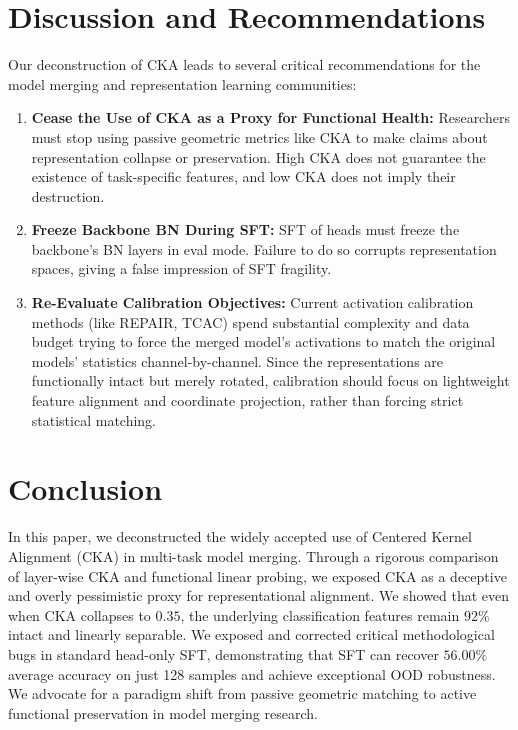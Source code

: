 \documentclass{article}
\theoremstyle{plain}
\theoremstyle{definition}
\theoremstyle{remark}
\begin{document}
\vspace{-2.5mm}
\section{Discussion and Recommendations}
\label{sec:discussion}

Our deconstruction of CKA leads to several critical recommendations for the model merging and representation learning communities:
\begin{enumerate}
  \item \textbf{Cease the Use of CKA as a Proxy for Functional Health:} Researchers must stop using passive geometric metrics like CKA to make claims about representation collapse or preservation. High CKA does not guarantee the existence of task-specific features, and low CKA does not imply their destruction.
  \item \textbf{Freeze Backbone BN During SFT:} SFT of heads must freeze the backbone's BN layers in eval mode. Failure to do so corrupts representation spaces, giving a false impression of SFT fragility.
  \item \textbf{Re-Evaluate Calibration Objectives:} Current activation calibration methods (like REPAIR, TCAC) spend substantial complexity and data budget trying to force the merged model's activations to match the original models' statistics channel-by-channel. Since the representations are functionally intact but merely rotated, calibration should focus on lightweight feature alignment and coordinate projection, rather than forcing strict statistical matching.
\end{enumerate}

\vspace{-2.5mm}
\section{Conclusion}
\label{sec:conclusion}

In this paper, we deconstructed the widely accepted use of Centered Kernel Alignment (CKA) in multi-task model merging. Through a rigorous comparison of layer-wise CKA and functional linear probing, we exposed CKA as a deceptive and overly pessimistic proxy for representational alignment. We showed that even when CKA collapses to $0.35$, the underlying classification features remain $92\%$ intact and linearly separable. We exposed and corrected critical methodological bugs in standard head-only SFT, demonstrating that SFT can recover $56.00\%$ average accuracy on just 128 samples and achieve exceptional OOD robustness. We advocate for a paradigm shift from passive geometric matching to active functional preservation in model merging research.
\end{document}
